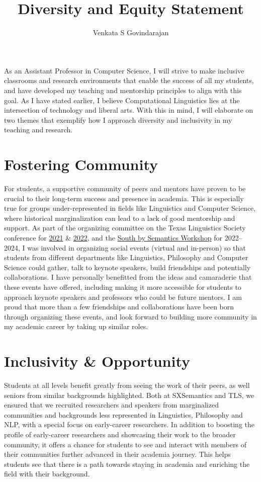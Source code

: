 \documentclass[11pt, letterpaper]{practical-report}
\title[]{Diversity and Equity Statement}
\author{Venkata S Govindarajan}
\date{}
\begin{document}
\maketitle
\thispagestyle{empty}

As an Assistant Professor in Computer Science, I will strive to make inclusive classrooms and research environments that enable the success of all my students, and have developed my teaching and mentorship principles to align with this goal. As I have stated earlier, I believe Computational Linguistics lies at the intersection of technology and liberal arts. With this in mind, I will elaborate on two themes that exemplify how I approach diversity and inclusivity in my teaching and research.

\section*{Fostering Community}

For students, a supportive community of peers and mentors have proven to be crucial to their long-term success and presence in academia. This is especially true for groups under-represented in fields like Linguistics and Computer Science, where historical marginalization can lead to a lack of good mentorship and support. As part of the organizing committee on the Texas Linguistics Society conference for \href{http://tls.ling.utexas.edu/2021/}{2021} \& \href{http://tls.ling.utexas.edu/2022/}{2022}, and the \href{http://sites.utexas.edu/sxsemantics}{South by Semantics Workshop} for 2022--2024, I was involved in organizing social events (virtual and in-person) so that students from different departments like Linguistics, Philosophy and Computer Science could gather, talk to keynote speakers, build friendships and potentially collaborations. I have personally benefitted from the ideas and camaraderie that these events have offered, including making it more accessible for students to approach keynote speakers and professors who could be future mentors. I am proud that more than a few friendships and collaborations have been born through organizing these events, and look forward to building more community in my academic career by taking up similar roles. 

\section*{Inclusivity \& Opportunity}

Students at all levels benefit greatly from seeing the work of their peers, as well seniors from similar backgrounds highlighted. Both at SXSemantics and TLS, we ensured that we recruited researchers and speakers from marginalized communities and backgrounds less represented in Linguistics, Philosophy and NLP, with a special focus on early-career researchers. In addition to boosting the profile of early-career researchers and showcasing their work to the broader community, it offers a chance for students to see and interact with members of their communities further advanced in their academia journey. This helps students see that there is a path towards staying in academia and enriching the field with their background.
\end{document}
